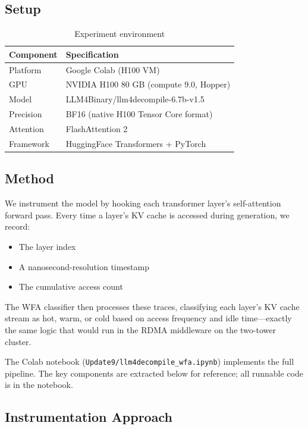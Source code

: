 \documentclass[11pt,letterpaper]{article}
\begin{document}
\subsection{Setup}

\begin{table}[htbp]
\centering
\caption{Experiment environment}
\label{tab:experiment-setup}
\begin{tabular}{@{}ll@{}}
\toprule
\textbf{Component} & \textbf{Specification} \\
\midrule
Platform & Google Colab (H100 VM) \\
GPU & NVIDIA H100 80 GB (compute 9.0, Hopper) \\
Model & LLM4Binary/llm4decompile-6.7b-v1.5 \\
Precision & BF16 (native H100 Tensor Core format) \\
Attention & FlashAttention 2 \\
Framework & HuggingFace Transformers + PyTorch \\
\bottomrule
\end{tabular}
\end{table}

\subsection{Method}

We instrument the model by hooking each transformer layer's self-attention forward pass. Every time a layer's KV cache is accessed during generation, we record:

\begin{itemize}
    \item The layer index
    \item A nanosecond-resolution timestamp
    \item The cumulative access count
\end{itemize}

The WFA classifier then processes these traces, classifying each layer's KV cache stream as hot, warm, or cold based on access frequency and idle time---exactly the same logic that would run in the RDMA middleware on the two-tower cluster.

The Colab notebook (\texttt{Update9/llm4decompile\_wfa.ipynb}) implements the full pipeline. The key components are extracted below for reference; all runnable code is in the notebook.

\subsection{Instrumentation Approach}
\end{document}
